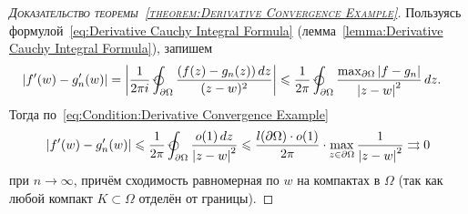 \documentclass[../complex-analysis.tex]{subfiles}
\begin{document}
\begin{proof}[\normalfont\textsc{Доказательство теоремы~\ref{theorem:Derivative Convergence Example}}]
 Пользуясь формулой~\eqref{eq:Derivative Cauchy Integral Formula} (лемма~\ref{lemma:Derivative Cauchy Integral Formula}), запишем
 \begin{align*}
  \left| f'(w) - g_n'(w) \right| &= \left| \frac{1}{2\pi i} \varointctrclockwise_{\partial\Omega} \frac{(f(z)-g_n(z))\,dz}{(z-w)^{2}}  \right| \leqslant \frac{1}{2\pi} \varointctrclockwise_{\partial\Omega} \frac{\max_{\partial\Omega} \left| f-g_n \right|}{\left| z-w \right|^{2}}\,dz.
 \end{align*} Тогда по~\eqref{eq:Condition:Derivative Convergence Example} 
 \begin{align*}
  \left| f'(w) - g_n'(w) \right| \leqslant \frac{1}{2\pi} \varointctrclockwise_{\partial\Omega} \frac{o(1)\,dz}{\left| z-w \right|^{2}} \leqslant \frac{l(\partial\Omega) \cdot o(1)}{2\pi} \cdot \max_{z \in \partial\Omega} \frac{1}{\left| z-w \right|^{2}} \rightrightarrows 0
 \end{align*} при $ n \to \infty $, причём сходимость равномерная по $ w $ на компактах в $ \Omega $ (так как любой компакт $ K \subset \Omega $ отделён от границы).
\end{proof}
\end{document}
